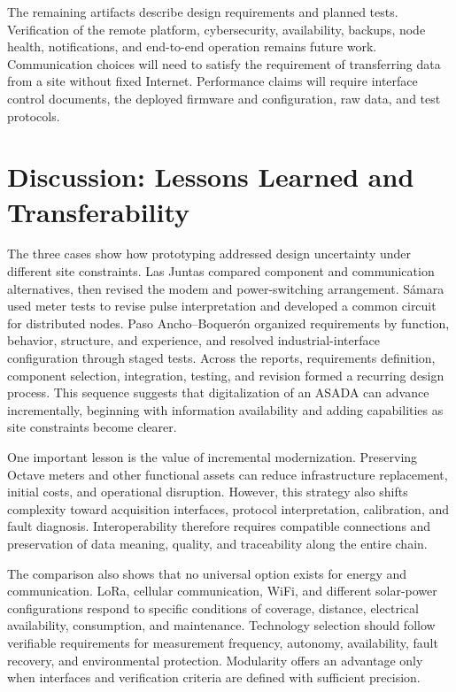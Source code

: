 \documentclass[conference]{IEEEtran}
\begin{document}
The remaining artifacts describe design requirements and planned tests. Verification of the remote platform, cybersecurity, availability, backups, node health, notifications, and end-to-end operation remains future work. Communication choices will need to satisfy the requirement of transferring data from a site without fixed Internet. Performance claims will require interface control documents, the deployed firmware and configuration, raw data, and test protocols.

\section{Discussion: Lessons Learned and Transferability}

The three cases show how prototyping addressed design uncertainty under different site constraints. Las Juntas compared component and communication alternatives, then revised the modem and power-switching arrangement. S\'{a}mara used meter tests to revise pulse interpretation and developed a common circuit for distributed nodes. Paso Ancho--Boquer\'{o}n organized requirements by function, behavior, structure, and experience, and resolved industrial-interface configuration through staged tests. Across the reports, requirements definition, component selection, integration, testing, and revision formed a recurring design process. This sequence suggests that digitalization of an ASADA can advance incrementally, beginning with information availability and adding capabilities as site constraints become clearer.

One important lesson is the value of incremental modernization. Preserving Octave meters and other functional assets can reduce infrastructure replacement, initial costs, and operational disruption. However, this strategy also shifts complexity toward acquisition interfaces, protocol interpretation, calibration, and fault diagnosis. Interoperability therefore requires compatible connections and preservation of data meaning, quality, and traceability along the entire chain.

The comparison also shows that no universal option exists for energy and communication. LoRa, cellular communication, WiFi, and different solar-power configurations respond to specific conditions of coverage, distance, electrical availability, consumption, and maintenance. Technology selection should follow verifiable requirements for measurement frequency, autonomy, availability, fault recovery, and environmental protection. Modularity offers an advantage only when interfaces and verification criteria are defined with sufficient precision.
\end{document}
